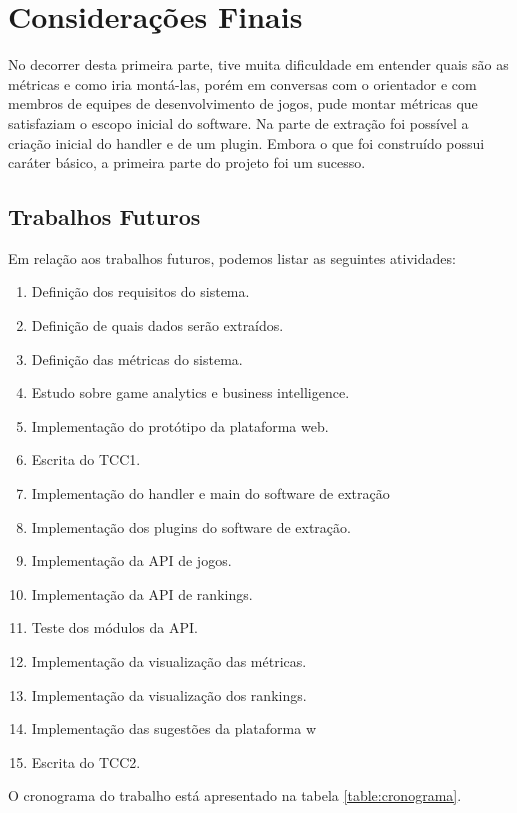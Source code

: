 \chapter[Considerações Finais]{Considerações Finais}
No decorrer desta primeira parte, tive muita dificuldade em entender quais são as métricas e como iria montá-las, porém em conversas com o orientador e com membros de equipes de desenvolvimento de jogos, pude montar métricas que satisfaziam o escopo inicial do software. Na parte de extração foi possível a criação inicial do handler e de um plugin. Embora o que foi construído possui caráter básico, a primeira parte do projeto foi um sucesso.
\section{Trabalhos Futuros}
Em relação aos trabalhos futuros, podemos listar as seguintes atividades:
\begin{enumerate}
	\item \label{t1} Definição dos requisitos do sistema.
	\item \label{t2} Definição de quais dados serão extraídos.
	\item \label{t3} Definição das métricas do sistema.
	\item \label{t4} Estudo sobre game analytics e business intelligence.
	\item \label{t5} Implementação do protótipo da plataforma web.
	\item \label{t6} Escrita do TCC1.
	\item \label{t7} Implementação do handler e main do software de extração
	\item \label{t8} Implementação dos plugins do software de extração.
	\item \label{t9} Implementação da API de jogos.
	\item \label{t10} Implementação da API de rankings.
	\item \label{t11} Teste dos módulos da API.
	\item \label{t12} Implementação da  visualização das métricas.
	\item \label{t13} Implementação da visualização dos rankings.
	\item \label{t14} Implementação das sugestões da plataforma w
	\item \label{t15} Escrita do TCC2.
\end{enumerate}
O cronograma do trabalho está apresentado na tabela \ref{table:cronograma}.
